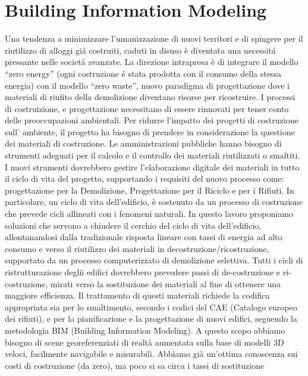 \section{Building Information Modeling}
\label{sec:chapter_1_section_1}
\noindent

Una tendenza a minimizzare l'umanizzazione di nuovi territori e di spingere per il riutilizzo di alloggi
gi\'a costruiti, caduti in disuso \`e diventata una necessit\'a pressante nelle societ\'a avanzate.
La direzione intrapresa è di integrare il modello ``zero energy'' (ogni costruzione \'e stata prodotta con il
consumo della stessa energia) con il modello ``zero waste'', nuovo paradigma di progettazione dove i materiali di
riufito della demolizione diventano risorse per ricostruire\cite{altamura:12}.
I processi di costruizione, e progettazione necessitano di essere rinnovati per tener conto delle preoccupazioni
ambientali. Per ridurre l'impatto dei progetti di costruzione sull' ambiente, il progetto ha bisogno di prendere in
considerazione la questione dei materiali di costruzione.
Le amministrazioni pubbliche hanno bisogno di strumenti adeguati per il calcolo e il controllo dei materiali
riutilizzati o smaltiti.
I nuovi strumenti dovrebbero gestire l'elaborazione digitale dei materiali in tutto il ciclo di vita del progetto,
supportando i requisiti del nuovo processo come: progettazione per la Demolizione, Progettazione per il Riciclo e per i Rifiuti.
In particolare, un ciclo di vita dell'edificio, è sostenuto da un processo di costruzione che prevede cicli allineati
con i fenomeni naturali.
In questo lavoro proponiamo soluzioni che servono a chiudere il cerchio del ciclo di vita dell'edificio, allontanandosi
dalla tradizionale risposta lineare con tassi di energia ad alto consumo e verso il riutilizzo
dei materiali in decostruzione/ricostruzione, supportato da un processo computerizzato di demolizione selettiva.
Tutti i cicli di ristrutturazione deglii edifici dovrebbero prevedere passi di de-costruzione e ri-costruzione, mirati
verso la sostituzione dei materiali al fine di ottenere una maggiore efficienza. Il trattamento di questi materiali
richiede la codifica appropriata sia per lo smaltimento, secondo i codici del CAE (Catalogo europeo dei rifiuti),
e per la pianificazione e la progettazione di nuovi edifici, seguendo la metodologia BIM (Building Information Modeling).
A questo scopo abbiamo bisogno di scene georeferenziati di realtà aumentata sulla base di modelli 3D veloci,
facilmente navigabile e misurabili.
Abbiamo già un'ottima conoscenza sui costi di costruzione (da zero), ma poco si sa circa i tassi di sostituzione

